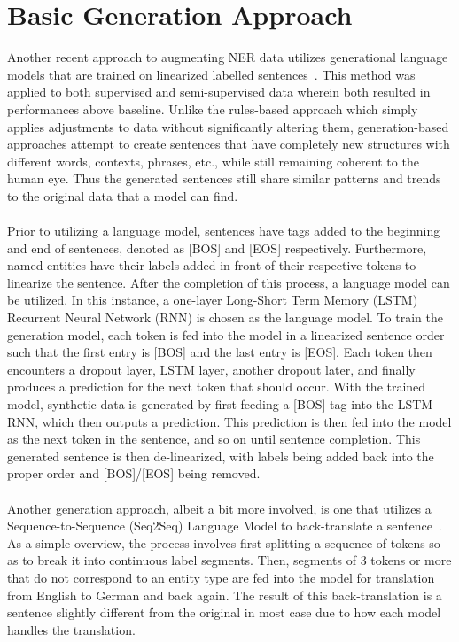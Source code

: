 \documentclass[12pt]{report}
\begin{document}
    \section{Basic Generation Approach}

        Another recent approach to augmenting NER data utilizes generational language models that are trained on linearized labelled sentences~\cite{Gen}. This method was applied to both supervised and semi-supervised data wherein both resulted in performances above baseline. Unlike the rules-based approach which simply applies adjustments to data without significantly altering them, generation-based approaches attempt to create sentences that have completely new structures with different words, contexts, phrases, etc., while still remaining coherent to the human eye. Thus the generated sentences still share similar patterns and trends to the original data that a model can find.
        \\\\
        Prior to utilizing a language model, sentences have tags added to the beginning and end of sentences, denoted as [BOS] and [EOS] respectively. Furthermore, named entities have their labels added in front of their respective tokens to linearize the sentence. After the completion of this process, a language model can be utilized. In this instance, a one-layer Long-Short Term Memory (LSTM) Recurrent Neural Network (RNN) is chosen as the language model. To train the generation model, each token is fed into the model in a linearized sentence order such that the first entry is [BOS] and the last entry is [EOS]. Each token then encounters a dropout layer, LSTM layer, another dropout later, and finally produces a prediction for the next token that should occur. With the trained model, synthetic data is generated by first feeding a [BOS] tag into the LSTM RNN, which then outputs a prediction. This prediction is then fed into the model as the next token in the sentence, and so on until sentence completion. This generated sentence is then de-linearized, with labels being added back into the proper order and [BOS]/[EOS] being removed.
        \\\\
        Another generation approach, albeit a bit more involved, is one that utilizes a Sequence-to-Sequence (Seq2Seq) Language Model to back-translate a sentence~\cite{Back}. As a simple overview, the process involves first splitting a sequence of tokens so as to break it into continuous label segments. Then, segments of 3 tokens or more that do not correspond to an entity type are fed into the model for translation from English to German and back again. The result of this back-translation is a sentence slightly different from the original in most case due to how each model handles the translation.
        
\end{document}
